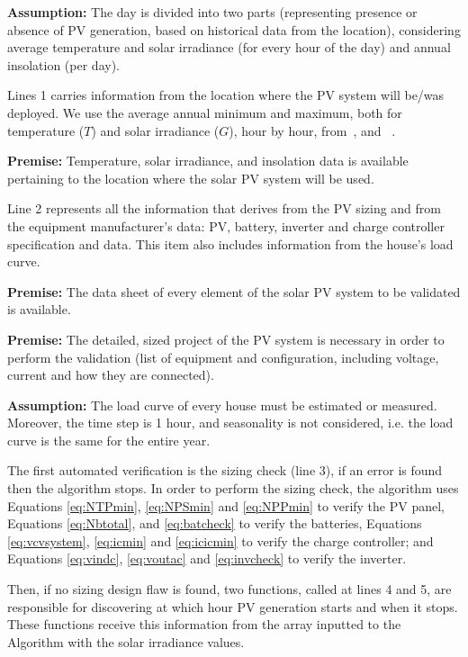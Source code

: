 \textbf{Assumption:} The day is divided into two parts (representing presence or absence of PV generation, based on historical data from the location), considering average temperature and solar irradiance (for every hour of the day) and  annual insolation (per day).

Lines 1 carries information from the location where the PV system will be/was deployed. We use the average annual minimum and maximum, both for temperature ($T$) and solar irradiance ($G$), hour by hour, from~\cite{Temperature}, and ~\cite{Irradiance}.

\textbf{Premise:} Temperature, solar irradiance, and insolation data is available pertaining to the location where the solar PV system will be used.

Line 2 represents all the information that derives from the PV sizing and from the equipment manufacturer's data: PV, battery, inverter and charge controller specification and data. This item also includes information from the house's load curve.

\textbf{Premise:} The data sheet of every element of the solar PV system to be validated is available.

\textbf{Premise:} The detailed, sized project of the PV system is necessary in order to perform the validation (list of equipment and configuration, including voltage, current and how they are connected).

\textbf{Assumption:} The load curve of every house must be estimated or measured. Moreover, the time step is 1 hour, and seasonality is not considered, i.e. the load curve is the same for the entire year.

The first automated verification is the sizing check (line 3), if an error is found then the algorithm stops. In order to perform the sizing check, the algorithm uses Equations \eqref{eq:NTPmin}, \eqref{eq:NPSmin} and \eqref{eq:NPPmin} to verify the PV panel, Equations \eqref{eq:Nbtotal}, and \eqref{eq:batcheck} to verify the batteries, Equations \eqref{eq:vcvsystem}, \eqref{eq:icmin} and \eqref{eq:icicmin} to verify the charge controller; and Equations \eqref{eq:vindc}, \eqref{eq:voutac} and \eqref{eq:invcheck} to verify the inverter.

Then, if no sizing design flaw is found, two functions, called at lines 4 and 5, are responsible for discovering at which hour PV generation starts and when it stops. These functions receive this information from the array inputted to the Algorithm with the solar irradiance values.

